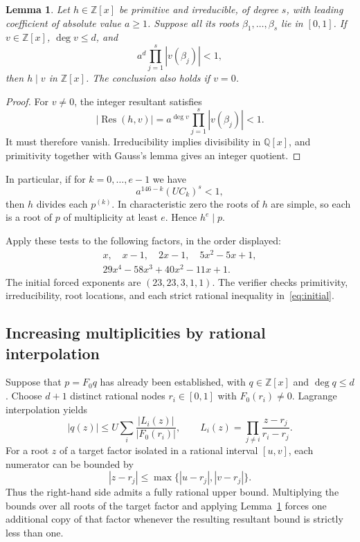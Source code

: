 \documentclass[11pt,a4paper]{article}
\newtheorem{lemma}[theorem]{Lemma}
\newcommand{\Z}{\mathbb Z}
\newcommand{\Q}{\mathbb Q}
\newcommand{\Res}{\operatorname{Res}}
\begin{document}
\begin{lemma}\label{lem:resultant}
Let $h\in\Z[x]$ be primitive and irreducible, of degree $s$, with leading coefficient of absolute value $a\ge1$. Suppose all its roots $\beta_1,\ldots,\beta_s$ lie in $[0,1]$. If $v\in\Z[x]$, $\deg v\le d$, and
\[
a^d\prod_{j=1}^s|v(\beta_j)|<1,
\]
then $h\mid v$ in $\Z[x]$. The conclusion also holds if $v=0$.
\end{lemma}
\begin{proof}
For $v\ne0$, the integer resultant satisfies
\[
|\Res(h,v)|=a^{\deg v}\prod_{j=1}^s|v(\beta_j)|<1.
\]
It must therefore vanish. Irreducibility implies divisibility in $\Q[x]$, and primitivity together with Gauss's lemma gives an integer quotient.
\end{proof}

In particular, if for $k=0,\ldots,e-1$ we have
\begin{equation}\label{eq:initial}
a^{146-k}(UC_k)^s<1,
\end{equation}
then $h$ divides each $p^{(k)}$. In characteristic zero the roots of $h$ are simple, so each is a root of $p$ of multiplicity at least $e$. Hence $h^e\mid p$.

Apply these tests to the following factors, in the order displayed:
\begin{gather*}
x,\quad x-1,\quad 2x-1,\quad 5x^2-5x+1,\\
29x^4-58x^3+40x^2-11x+1.
\end{gather*}
The initial forced exponents are $(23,23,3,1,1)$. The verifier checks primitivity, irreducibility, root locations, and each strict rational inequality in~\eqref{eq:initial}.

\subsection{Increasing multiplicities by rational interpolation}
Suppose that $p=F_0q$ has already been established, with $q\in\Z[x]$ and $\deg q\le d$. Choose $d+1$ distinct rational nodes $r_i\in[0,1]$ with $F_0(r_i)\ne0$. Lagrange interpolation yields
\begin{equation}\label{eq:interpolation}
|q(z)|\le U\sum_i\frac{|L_i(z)|}{|F_0(r_i)|},\qquad
L_i(z)=\prod_{j\ne i}\frac{z-r_j}{r_i-r_j}.
\end{equation}
For a root $z$ of a target factor isolated in a rational interval $[u,v]$, each numerator can be bounded by
\[
|z-r_j|\le\max\{|u-r_j|,|v-r_j|\}.
\]
Thus the right-hand side admits a fully rational upper bound. Multiplying the bounds over all roots of the target factor and applying Lemma~\ref{lem:resultant} forces one additional copy of that factor whenever the resulting resultant bound is strictly less than one.
\end{document}
